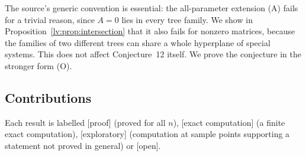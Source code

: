 \documentclass[11pt,a4paper]{article}
\theoremstyle{definition}
\theoremstyle{remark}
\newcommand{\lab}[1]{\textsf{[#1]}}
\begin{document}
The source's generic convention is essential: the all-parameter extension (A) fails for a trivial reason, since $A=0$ lies in every tree family. We show in Proposition~\ref{lv:prop:intersection} that it also fails for nonzero matrices, because the families of two different trees can share a whole hyperplane of special systems. This does not affect Conjecture~12 itself. We prove the conjecture in the stronger form (O).

\subsection{Contributions}

Each result is labelled \lab{proof} (proved for all $n$), \lab{exact computation} (a finite exact computation), \lab{exploratory} (computation at sample points supporting a statement not proved in general) or \lab{open}.
\end{document}
